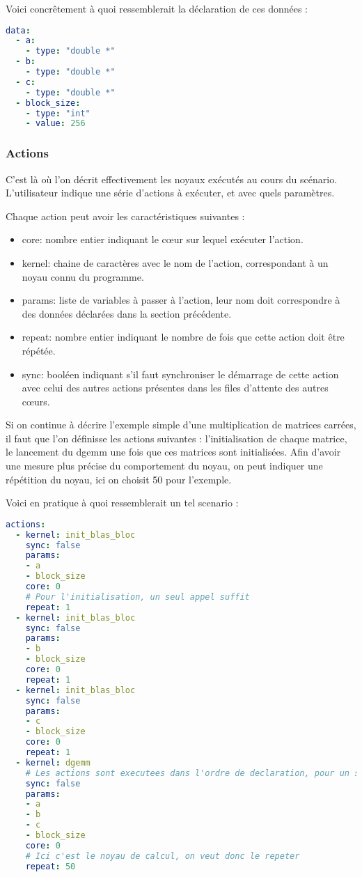 Voici concrêtement à quoi ressemblerait la déclaration de ces données :

\begin{lstlisting}[language=yaml,caption=Exemple de déclaration de variables,label=lst:tool:data-example]
data:
  - a:
    - type: "double *"
  - b:
    - type: "double *"
  - c:
    - type: "double *"
  - block_size:
    - type: "int"
    - value: 256
\end{lstlisting}

\subsubsection{Actions}

C'est là où l'on décrit effectivement les noyaux exécutés au cours du scénario.
L'utilisateur indique une série d'actions à exécuter, et avec quels paramètres.

Chaque action peut avoir les caractéristiques suivantes :
\begin{itemize}
  \item core: nombre entier indiquant le cœur sur lequel exécuter l'action.
  \item kernel: chaine de caractères avec le nom de l'action, correspondant à un noyau connu du programme.
  \item params: liste de variables à passer à l'action, leur nom doit correspondre à des données déclarées dans la section précédente.
  \item repeat: nombre entier indiquant le nombre de fois que cette action doit être répétée.
  \item sync: booléen indiquant s'il faut synchroniser le démarrage de cette action avec celui des autres actions présentes dans les files d'attente des autres cœurs.
\end{itemize}

Si on continue à décrire l'exemple simple d'une multiplication de matrices carrées, il faut que l'on définisse les actions suivantes : l'initialisation de chaque matrice, le lancement du dgemm une fois que ces matrices sont initialisées.
Afin d'avoir une mesure plus précise du comportement du noyau, on peut indiquer une répétition du noyau, ici on choisit 50 pour l'exemple.

Voici en pratique à quoi ressemblerait un tel scenario :
\begin{lstlisting}[language=yaml,caption=Exemple de déclaration d'actions,label=lst:tool:actions-example]
actions:
  - kernel: init_blas_bloc
    sync: false
    params: 
    - a
    - block_size
    core: 0
    # Pour l'initialisation, un seul appel suffit
    repeat: 1
  - kernel: init_blas_bloc
    sync: false
    params: 
    - b
    - block_size
    core: 0
    repeat: 1
  - kernel: init_blas_bloc
    sync: false
    params: 
    - c
    - block_size
    core: 0
    repeat: 1
  - kernel: dgemm
    # Les actions sont executees dans l'ordre de declaration, pour un seul dgemm c'est inutile de synchroniser
    sync: false
    params: 
    - a
    - b
    - c
    - block_size
    core: 0
    # Ici c'est le noyau de calcul, on veut donc le repeter
    repeat: 50
\end{lstlisting}

